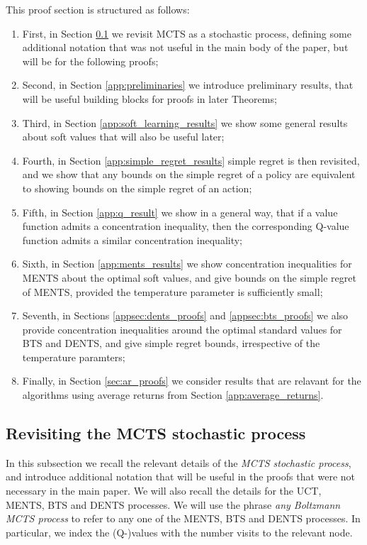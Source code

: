 \documentclass{article}
\theoremstyle{plain}
\begin{document}
\begin{appendices}
    This proof section is structured as follows:
    \begin{enumerate}
        \item First, in Section \ref{app:mcts_process} we revisit MCTS as a stochastic process, defining some additional notation that was not useful in the main body of the paper, but will be for the following proofs;
        \item Second, in Section \ref{app:preliminaries} we introduce preliminary results, that will be useful building blocks for proofs in later Theorems;
        \item Third, in Section \ref{app:soft_learning_results} we show some general results about soft values that will also be useful later;
        \item Fourth, in Section \ref{app:simple_regret_results} simple regret is then revisited, and we show that any bounds on the simple regret of a policy are equivalent to showing bounds on the simple regret of an action;
        \item Fifth, in Section \ref{app:q_result} we show in a general way, that if a value function admits a concentration inequality, then the corresponding Q-value function admits a similar concentration inequality;
        \item Sixth, in Section \ref{app:ments_results} we show concentration inequalities for MENTS about the optimal soft values, and give bounds on the simple regret of MENTS, provided the temperature parameter is sufficiently small;
        \item Seventh, in Sections \ref{appsec:dents_proofs} and \ref{appsec:bts_proofs} we also provide concentration inequalities around the optimal standard values for BTS and DENTS, and give simple regret bounds, irrespective of the temperature paramters;
        \item Finally, in Section \ref{sec:ar_proofs} we consider results that are relavant for the algorithms using average returns from Section \ref{app:average_returns}.
    \end{enumerate}
    
    
    
    
    
    
    
    
    \subsection{Revisiting the MCTS stochastic process} \label{app:mcts_process}
        In this subsection we recall the relevant details of the \textit{MCTS stochastic process}, and introduce additional notation that will be useful in the proofs that were not necessary in the main paper. We will also recall the details for the UCT, MENTS, BTS and DENTS processes. We will use the phrase \textit{any Boltzmann MCTS process} to refer to any one of the MENTS, BTS and DENTS processes. In particular, we index the (Q-)values with the number visits to the relevant node.
        

\end{appendices}
\end{document}

